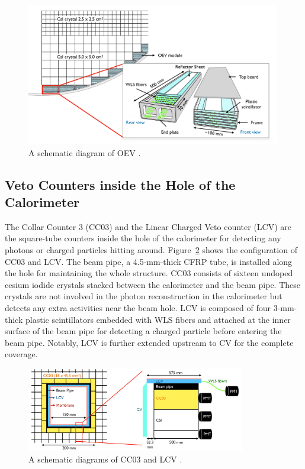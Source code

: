 \begin{figure}[h]
\begin{center}
\captionsetup{width=.99\linewidth}
\includegraphics[width=0.99\textwidth]{Figures/Chapter3/OEV_config.pdf}
\caption{A schematic diagram of OEV \parencite{OEV}.}
\label{fig:OEV}
\end{center}
\end{figure}



\subsection{Veto Counters inside the Hole of the Calorimeter}
The Collar Counter 3 (CC03) \parencite{CC03} and the Linear Charged Veto counter (LCV) \parencite{LCV} are the square-tube counters inside the hole of the calorimeter for detecting any photons or charged particles hitting around. Figure~\ref{fig:CC03_LCV} shows the configuration of CC03 and LCV. The beam pipe, a 4.5-mm-thick CFRP tube, is installed along the hole for maintaining the whole structure. CC03 consists of sixteen undoped cesium iodide crystals stacked between the calorimeter and the beam pipe. These crystals are not involved in the photon reconstruction in the calorimeter but detects any extra activities near the beam hole. LCV is composed of four 3-mm-thick plastic scintillators embedded with WLS fibers and attached at the inner surface of the beam pipe for detecting a charged particle before entering the beam pipe. Notably, LCV is further extended upstream to CV for the complete coverage.

\begin{figure}[h]
\begin{center}
\captionsetup{width=.99\linewidth}
\includegraphics[width=0.85\textwidth]{Figures/Chapter3/CC03_LCV.pdf}
\caption{A schematic diagrams of CC03 and LCV \parencite{Maeda}.}
\label{fig:CC03_LCV}
\end{center}
\end{figure}

